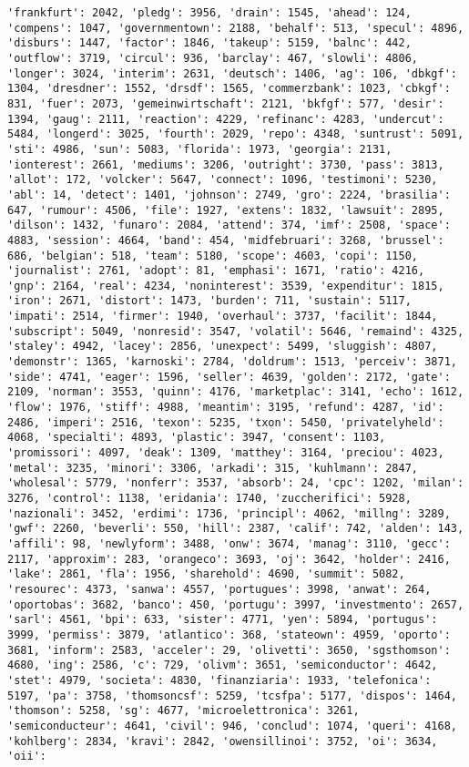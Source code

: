 \documentclass[11pt]{article}
\begin{document}
\begin{Verbatim}[commandchars=\\\{\}]
'frankfurt': 2042, 'pledg': 3956, 'drain': 1545, 'ahead': 124, 'compens': 1047, 'governmentown': 2188, 'behalf': 513, 'specul': 4896, 'disburs': 1447, 'factor': 1846, 'takeup': 5159, 'balnc': 442, 'outflow': 3719, 'circul': 936, 'barclay': 467, 'slowli': 4806, 'longer': 3024, 'interim': 2631, 'deutsch': 1406, 'ag': 106, 'dbkgf': 1304, 'dresdner': 1552, 'drsdf': 1565, 'commerzbank': 1023, 'cbkgf': 831, 'fuer': 2073, 'gemeinwirtschaft': 2121, 'bkfgf': 577, 'desir': 1394, 'gaug': 2111, 'reaction': 4229, 'refinanc': 4283, 'undercut': 5484, 'longerd': 3025, 'fourth': 2029, 'repo': 4348, 'suntrust': 5091, 'sti': 4986, 'sun': 5083, 'florida': 1973, 'georgia': 2131, 'ionterest': 2661, 'mediums': 3206, 'outright': 3730, 'pass': 3813, 'allot': 172, 'volcker': 5647, 'connect': 1096, 'testimoni': 5230, 'abl': 14, 'detect': 1401, 'johnson': 2749, 'gro': 2224, 'brasilia': 647, 'rumour': 4506, 'file': 1927, 'extens': 1832, 'lawsuit': 2895, 'dilson': 1432, 'funaro': 2084, 'attend': 374, 'imf': 2508, 'space': 4883, 'session': 4664, 'band': 454, 'midfebruari': 3268, 'brussel': 686, 'belgian': 518, 'team': 5180, 'scope': 4603, 'copi': 1150, 'journalist': 2761, 'adopt': 81, 'emphasi': 1671, 'ratio': 4216, 'gnp': 2164, 'real': 4234, 'noninterest': 3539, 'expenditur': 1815, 'iron': 2671, 'distort': 1473, 'burden': 711, 'sustain': 5117, 'impati': 2514, 'firmer': 1940, 'overhaul': 3737, 'facilit': 1844, 'subscript': 5049, 'nonresid': 3547, 'volatil': 5646, 'remaind': 4325, 'staley': 4942, 'lacey': 2856, 'unexpect': 5499, 'sluggish': 4807, 'demonstr': 1365, 'karnoski': 2784, 'doldrum': 1513, 'perceiv': 3871, 'side': 4741, 'eager': 1596, 'seller': 4639, 'golden': 2172, 'gate': 2109, 'norman': 3553, 'quinn': 4176, 'marketplac': 3141, 'echo': 1612, 'flow': 1976, 'stiff': 4988, 'meantim': 3195, 'refund': 4287, 'id': 2486, 'imperi': 2516, 'texon': 5235, 'txon': 5450, 'privatelyheld': 4068, 'specialti': 4893, 'plastic': 3947, 'consent': 1103, 'promissori': 4097, 'deak': 1309, 'matthey': 3164, 'preciou': 4023, 'metal': 3235, 'minori': 3306, 'arkadi': 315, 'kuhlmann': 2847, 'wholesal': 5779, 'nonferr': 3537, 'absorb': 24, 'cpc': 1202, 'milan': 3276, 'control': 1138, 'eridania': 1740, 'zuccherifici': 5928, 'nazionali': 3452, 'erdimi': 1736, 'principl': 4062, 'millng': 3289, 'gwf': 2260, 'beverli': 550, 'hill': 2387, 'calif': 742, 'alden': 143, 'affili': 98, 'newlyform': 3488, 'onw': 3674, 'manag': 3110, 'gecc': 2117, 'approxim': 283, 'orangeco': 3693, 'oj': 3642, 'holder': 2416, 'lake': 2861, 'fla': 1956, 'sharehold': 4690, 'summit': 5082, 'resourec': 4373, 'sanwa': 4557, 'portugues': 3998, 'anwat': 264, 'oportobas': 3682, 'banco': 450, 'portugu': 3997, 'investmento': 2657, 'sarl': 4561, 'bpi': 633, 'sister': 4771, 'yen': 5894, 'portugus': 3999, 'permiss': 3879, 'atlantico': 368, 'stateown': 4959, 'oporto': 3681, 'inform': 2583, 'acceler': 29, 'olivetti': 3650, 'sgsthomson': 4680, 'ing': 2586, 'c': 729, 'olivm': 3651, 'semiconductor': 4642, 'stet': 4979, 'societa': 4830, 'finanziaria': 1933, 'telefonica': 5197, 'pa': 3758, 'thomsoncsf': 5259, 'tcsfpa': 5177, 'dispos': 1464, 'thomson': 5258, 'sg': 4677, 'microelettronica': 3261, 'semiconducteur': 4641, 'civil': 946, 'conclud': 1074, 'queri': 4168, 'kohlberg': 2834, 'kravi': 2842, 'owensillinoi': 3752, 'oi': 3634, 'oii': 
\end{Verbatim}
\end{document}
